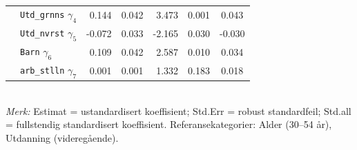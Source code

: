 \documentclass[
  12pt,
  a4paper,
  DIV=11,
  numbers=noendperiod]{scrartcl}
\begin{document}
\begin{table}[htbp]
\begin{tabular}{@{}llrrrrc@{}}
& \texttt{Utd\_grnns} $\gamma_4$        & 0.144 & 0.042 & 3.473  & 0.001   & 0.043 \\
& \texttt{Utd\_nvrst} $\gamma_5$        & -0.072& 0.033 & -2.165 & 0.030   & -0.030 \\
& \texttt{Barn} $\gamma_6$              & 0.109 & 0.042 & 2.587  & 0.010   & 0.034 \\
& \texttt{arb\_stlln} $\gamma_7$        & 0.001 & 0.001 & 1.332  & 0.183   & 0.018 \\
\bottomrule
\end{tabular}
\raggedright
\footnotesize{\\
\textit{Merk:} Estimat = ustandardisert koeffisient; Std.Err = robust standardfeil; Std.all = fullstendig standardisert koeffisient. Referansekategorier: Alder (30–54 år), Utdanning (videregående).}
\end{table}
\end{document}
